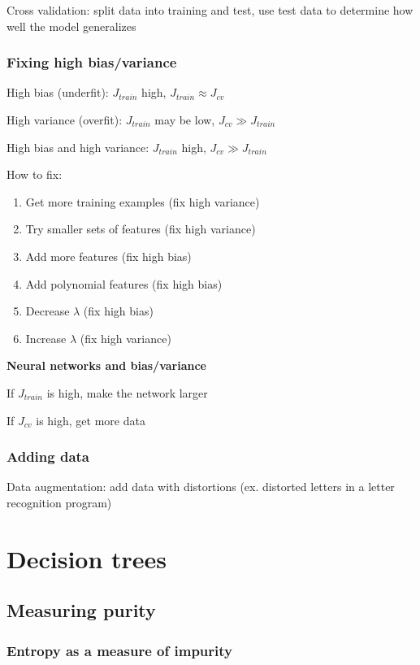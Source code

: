 \documentclass[12pt]{article}
\begin{document}
Cross validation: split data into training and test, use test data to determine how well the model generalizes

\subsubsection{Fixing high bias/variance}

High bias (underfit): $J_{train}$ high, $J_{train} \approx J_{cv}$

High variance (overfit): $J_{train}$ may be low, $J_{cv} \gg J_{train}$

High bias and high variance: $J_{train}$ high, $J_{cv} \gg J_{train}$

How to fix:

\begin{enumerate}
\item Get more training examples (fix high variance)
\item Try smaller sets of features (fix high variance)
\item Add more features (fix high bias)
\item Add polynomial features (fix high bias)
\item Decrease $\lambda$ (fix high bias)
\item Increase $\lambda$ (fix high variance)
\end{enumerate}

\textbf{Neural networks and bias/variance}

If $J_{train}$ is high, make the network larger

If $J_{cv}$ is high, get more data

\subsubsection{Adding data}

Data augmentation: add data with distortions (ex. distorted letters in a letter recognition program)

\section{Decision trees}

\subsection{Measuring purity}

\subsubsection{Entropy as a measure of impurity}
\end{document}
